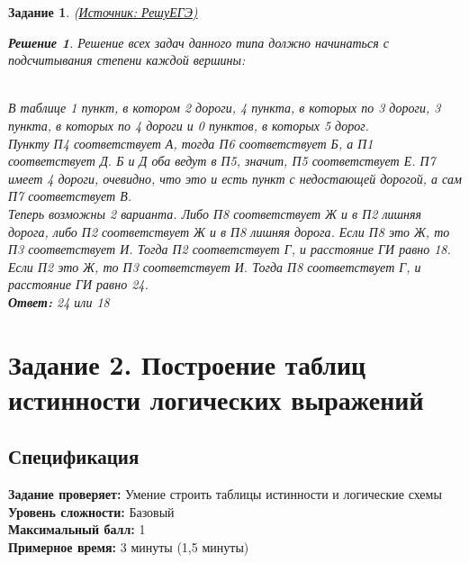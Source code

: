 \documentclass[12pt]{article}
\theoremstyle{problem_style}
\newtheorem{problem}{Задание}[subsection]
\newtheorem{solution}{Решение}[subsection]
\begin{document}
\begin{problem}
(\href{https://inf-ege.sdamgia.ru/}{Источник: РешуЕГЭ)} %
\begin{solution}
Решение всех задач данного типа должно начинаться с подсчитывания степени каждой вершины:
\begin{figure}[h]
    \centering
\end{figure}\\
В таблице 1 пункт, в котором 2 дороги,  4 пункта, в которых по 3 дороги, 3 пункта, в которых по 4 дороги и 0 пунктов, в которых 5 дорог.\\
Пункту П4 соответствует А, тогда П6 соответствует Б, а П1 соответствует Д. Б и Д оба ведут в П5, значит, П5 соответствует Е. П7 имеет 4 дороги, очевидно, что это и есть пункт с недостающей дорогой, а сам П7 соответствует В.\\
Теперь возможны 2 варианта. Либо П8 соответствует Ж и в П2 лишняя дорога, либо П2 соответствует Ж и в П8 лишняя дорога. Если П8 это Ж, то П3 соответствует И. Тогда П2 соответствует Г, и расстояние ГИ равно 18. Если П2 это Ж, то П3 соответствует И. Тогда П8 соответствует Г, и расстояние ГИ равно 24.\\
\textbf{Ответ:} 24 или 18
\end{solution}
\newpage
\end{problem}






\section{Задание 2. Построение таблиц истинности логических выражений}
\subsection{Спецификация}
\textbf{Задание проверяет:}
Умение строить таблицы истинности и логические схемы\\
\textbf{Уровень сложности:}
Базовый\\
\textbf{Максимальный балл:}
1\\
\textbf{Примерное время:}
3 минуты (1,5 минуты)
\end{document}
